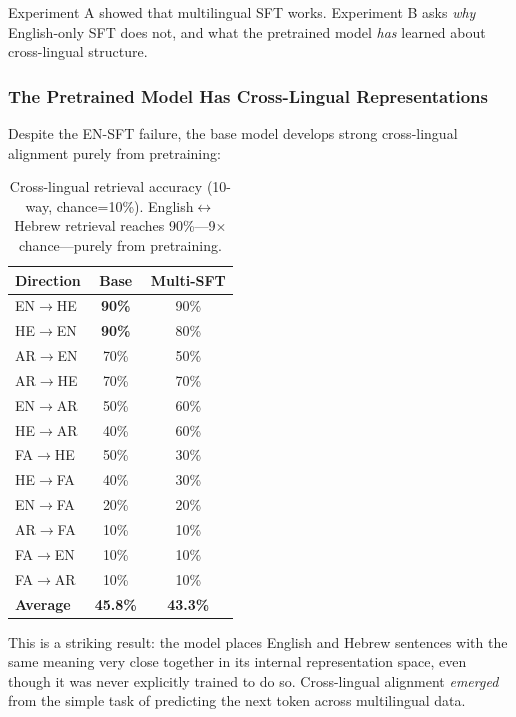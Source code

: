 \documentclass[11pt,a4paper]{article}
\begin{document}
Experiment A showed that multilingual SFT works. Experiment B asks \emph{why} English-only SFT does not, and what the pretrained model \emph{has} learned about cross-lingual structure.

\subsubsection{The Pretrained Model Has Cross-Lingual Representations}

Despite the EN-SFT failure, the base model develops strong cross-lingual alignment purely from pretraining:

\begin{table}[H]
\centering
\begin{tabular}{lcc}
\toprule
\textbf{Direction} & \textbf{Base} & \textbf{Multi-SFT} \\
\midrule
EN$\rightarrow$HE & \textbf{90\%} & 90\% \\
HE$\rightarrow$EN & \textbf{90\%} & 80\% \\
AR$\rightarrow$EN & 70\% & 50\% \\
AR$\rightarrow$HE & 70\% & 70\% \\
EN$\rightarrow$AR & 50\% & 60\% \\
HE$\rightarrow$AR & 40\% & 60\% \\
FA$\rightarrow$HE & 50\% & 30\% \\
HE$\rightarrow$FA & 40\% & 30\% \\
EN$\rightarrow$FA & 20\% & 20\% \\
AR$\rightarrow$FA & 10\% & 10\% \\
FA$\rightarrow$EN & 10\% & 10\% \\
FA$\rightarrow$AR & 10\% & 10\% \\
\midrule
\textbf{Average} & \textbf{45.8\%} & \textbf{43.3\%} \\
\bottomrule
\end{tabular}
\caption{Cross-lingual retrieval accuracy (10-way, chance=10\%). English$\leftrightarrow$Hebrew retrieval reaches 90\%---9$\times$ chance---purely from pretraining.}
\label{tab:results_retrieval}
\end{table}

This is a striking result: the model places English and Hebrew sentences with the same meaning very close together in its internal representation space, even though it was never explicitly trained to do so. Cross-lingual alignment \emph{emerged} from the simple task of predicting the next token across multilingual data.
\end{document}
